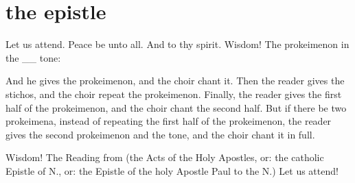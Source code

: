 \section{the epistle}

\begin{liturgicaltext}
    \deacon Let us attend.
    \priest Peace be unto all.
    \reader And to thy spirit.
    \deacon Wisdom!
    \reader The prokeimenon in the \_\_ tone:
\end{liturgicaltext}
\begin{rubricmed}
    And he gives the prokeimenon, and the choir chant it. Then the reader gives the stichos, and the choir repeat the prokeimenon. Finally, the reader gives the first half of the prokeimenon, and the choir chant the second half. But if there be two prokeimena, instead of repeating the first half of the prokeimenon, the reader gives the second prokeimenon and the tone, and the choir chant it in full.
\end{rubricmed}
\begin{liturgicaltext}
    \deacon Wisdom!
    \reader The Reading from (the Acts of the Holy Apostles, or: the catholic Epistle of N., or: the Epistle of the holy Apostle Paul to the N.)
    \deacon Let us attend!
    \reader {}
\end{liturgicaltext}

